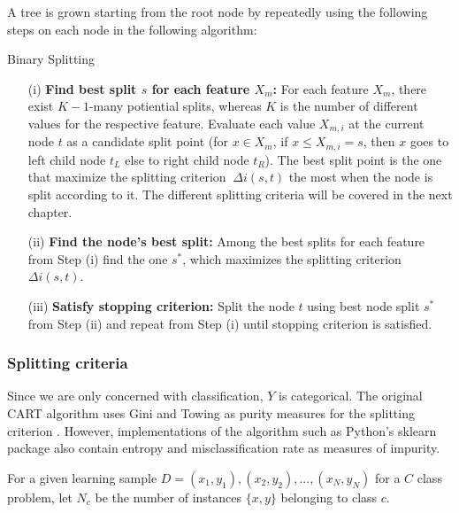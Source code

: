 A tree is grown starting from the root node by repeatedly using the following steps on each
node in the following algorithm:

\begin{algorithm}[H]
    \caption{Binary Splitting \cite{breiman1984classification}}
    \label{alg:binary_splitting}
    \SetAlgoLined
    \begin{itemize}
        \item[(i)] \textbf{Find best split \(s\) for each feature \(X_{m}\):}
        For each feature \(X_{m}\), there exist \(K-1\)-many potiential splits, 
        whereas \(K\) is the number of different values for the respective feature.
        Evaluate each value \(X_{m,i}\) at the current node \(t\) as a 
        candidate split point (for \(x \in X_{m}\), if \(x \leq X_{m,i}=s\),
        then \(x\) goes to left child node \(t_{L}\) else to right child node \(t_{R}\)).
        The best split point is the one that maximize the splitting criterion \(\ \Delta i(s,t) \) the most when the node is split according to it.
        The different splitting criteria will be covered in the next chapter.

        \item[(ii)] \textbf{Find the node’s best split:} Among the best splits for each feature from Step (i) find the 
        one \(s^{*}\), which maximizes the splitting criterion \(\Delta i(s,t)\).

        \item[(iii)] \textbf{Satisfy stopping criterion:} Split the node \(t\) using best node split \(s^{*}\) from Step (ii) 
        and repeat from Step (i) until stopping criterion is satisfied. 
    \end{itemize}
    \end{algorithm}


\subsubsection{Splitting criteria}
Since we are only concerned with classification, \(Y\) is categorical. The original CART algorithm uses Gini and Towing as 
purity measures for the splitting criterion \cite{breiman1984classification}. 
However, implementations of the algorithm such as Python's sklearn package \cite{scikit2011learn} also contain entropy and misclassification rate as measures of impurity.

For a given learning sample \( D = {(x_{1},y_{1}), (x_{2}, y_{2}), ... , (x_{N}, y_{N})} \) 
for a \(C\) class problem, let \(N_{c}\) be the number of instances \( \{x,y\}  \)
belonging to class \(c\).

